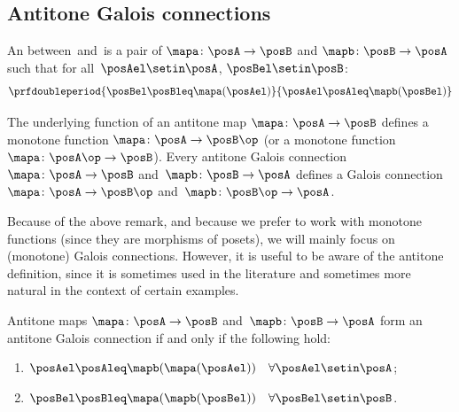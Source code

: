 


\subsection{Antitone Galois connections}

\begin{ctdefinition}\label{def:antitone-galois-connection}
    An  between~\posA and~\posB is a pair of  $\mapa\colon \posA\to \posB$ and $\mapb \colon \posB\to \posA$ such that for all~$\posAel\setin \posA$, $\posBel\setin \posB$:
    \begin{equation}
        \prfdoubleperiod{\posBel \posBleq \mapa(\posAel)}{\posAel \posAleq \mapb(\posBel)}
    \end{equation}
\end{ctdefinition}

\begin{remark}\label{rem:not-focusing-on-antitone-Galois-connections}
    The underlying function of an antitone map $\mapa\colon \posA\to \posB$ defines a monotone function $\mapa\colon \posA\to \posB\op$ (or a monotone function $\mapa \colon \posA \op \to \posB$).
    Every antitone Galois connection $\mapa \colon \posA \to \posB$ and~$\mapb \colon \posB \to \posA$ defines a Galois connection $\mapa \colon \posA \to \posB\op$ and~$\mapb \colon \posB\op \to \posA$.
\end{remark}

Because of the above remark, and because we prefer to work with monotone functions (since they are morphisms of posets), we will mainly focus on (monotone) Galois connections.
However, it is useful to be aware of the antitone definition, since it is sometimes used in the literature and sometimes more natural in the context of certain examples.

\begin{lemma}\label{lem:alternative-def-antitone-Galois-connection}
    Antitone maps $\mapa\colon \posA\to \posB$ and~$\mapb\colon \posB\to \posA$ form an antitone Galois connection if and only if the following hold:
    \begin{enumerate}
        \item $\posAel\posAleq \mapb(\mapa(\posAel)) \quad \forall \posAel\setin \posA$;
        \item $\posBel\posBleq \mapa(\mapb(\posBel)) \quad \forall \posBel\setin \posB$.
    \end{enumerate}
\end{lemma}


